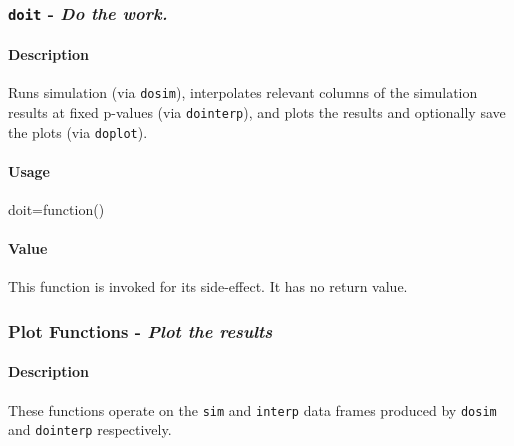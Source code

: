 \documentclass[]{article}
\newenvironment{Shaded}{\begin{snugshade}}{\end{snugshade}}
\newcommand{\NormalTok}[1]{{#1}}
\let\oldparagraph\paragraph
\renewcommand{\paragraph}[1]{\oldparagraph{#1}\mbox{}}
\begin{document}
\subsubsection{\texorpdfstring{\texttt{doit} - \emph{Do the
work.}}{doit - Do the work.}}\label{doit---do-the-work.}

\paragraph{Description}\label{description-2}

Runs simulation (via \texttt{dosim}), interpolates relevant columns of
the simulation results at fixed p-values (via \texttt{dointerp}), and
plots the results and optionally save the plots (via \texttt{doplot}).

\paragraph{Usage}\label{usage-2}

\begin{Shaded}
\begin{Highlighting}[]
\NormalTok{doit=function()}
\end{Highlighting}
\end{Shaded}

\paragraph{Value}\label{value-2}

This function is invoked for its side-effect. It has no return value.

\protect\hypertarget{doplot}{}{}\protect\hypertarget{plot_byprop}{}{}\protect\hypertarget{plot_byd}{}{}\protect\hypertarget{plot_vsprop}{}{}\protect\hypertarget{plot_vsd}{}{}

\subsubsection{\texorpdfstring{Plot Functions - \emph{Plot the
results}}{Plot Functions - Plot the results}}\label{plot-functions---plot-the-results}

\paragraph{Description}\label{description-3}

These functions operate on the \texttt{sim} and \texttt{interp} data
frames produced by \texttt{dosim} and \texttt{dointerp} respectively.
\end{document}
